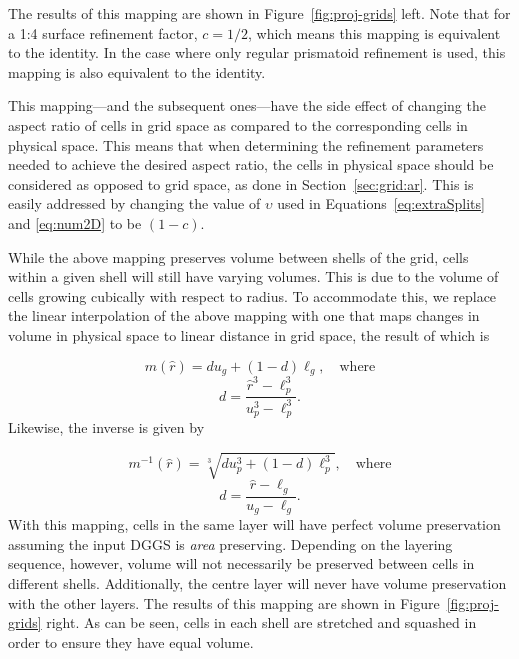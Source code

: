 The results of this mapping are shown in Figure~\ref{fig:proj-grids} left.
Note that for a 1:4 surface refinement factor, $c = 1/2$, which means this mapping is equivalent to the identity.
In the case where only regular prismatoid refinement is used, this mapping is also equivalent to the identity.


This mapping---and the subsequent ones---have the side effect of changing the aspect ratio of cells in grid space as compared to the corresponding cells in physical space.
This means that when determining the refinement parameters needed to achieve the desired aspect ratio, the cells in physical space should be considered as opposed to grid space, as done in Section~\ref{sec:grid:ar}.
This is easily addressed by changing the value of $\upsilon$ used in Equations~\ref{eq:extraSplits} and \ref{eq:num2D} to be $(1 - c)$.


While the above mapping preserves volume between shells of the grid, cells within a given shell will still have varying volumes.
This is due to the volume of cells growing cubically with respect to radius.
To accommodate this, we replace the linear interpolation of the above mapping with one that maps changes in volume in physical space to linear distance in grid space, the result of which is

\begin{equation*}
m(\hat{r}) = du_g + (1-d)\ell_g, \quad \text{where}
\end{equation*}
%
\begin{equation*}
d = \frac{ \hat{r}^3 - \ell_p^3} {u_p^3 - \ell_p^3}.
\end{equation*}
%
Likewise, the inverse is given by

\begin{equation*}
m^{-1}(\hat{r}) = \sqrt[3]{ d u_p^{3} + \left( 1 - d \right) \ell_p^{3} }, \quad \text{where}
\end{equation*}
%
\begin{equation*}
d = \frac{\hat{r} - \ell_g}{u_g - \ell_g}.
\end{equation*}
%
With this mapping, cells in the same layer will have perfect volume preservation assuming the input DGGS is \textit{area} preserving.
Depending on the layering sequence, however, volume will not necessarily be preserved between cells in different shells.
Additionally, the centre layer will never have volume preservation with the other layers.
The results of this mapping are shown in Figure~\ref{fig:proj-grids} right.
As can be seen, cells in each shell are stretched and squashed in order to ensure they have equal volume.


